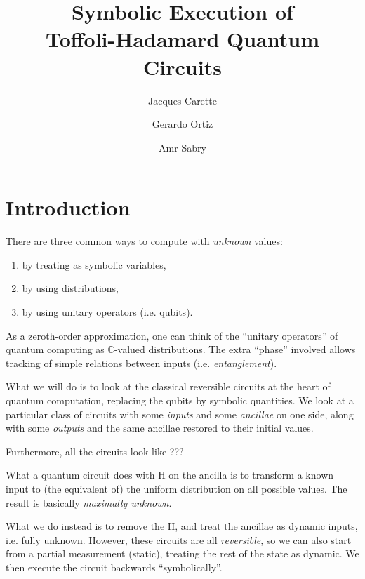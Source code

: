 \documentclass[sigplan]{acmart}
\newcommand{\Cplx}{\ensuremath{\mathbb{C}}}
\begin{document}
\title{Symbolic Execution of \\
  Toffoli-Hadamard Quantum Circuits}

\author{Jacques Carette}

\author{Gerardo Ortiz}

\author{Amr Sabry}

\maketitle

\section{Introduction}

There are three common ways to compute with \emph{unknown} values:
\begin{enumerate}
  \item by treating as symbolic variables,
  \item by using distributions,
  \item by using unitary operators (i.e. qubits).
\end{enumerate}
As a zeroth-order approximation, one can think of the ``unitary operators'' of quantum
computing as \Cplx-valued distributions. The extra ``phase'' involved allows tracking of
simple relations between inputs (i.e. \emph{entanglement}).

What we will do is to look at the classical reversible circuits at the heart
of quantum computation, replacing the qubits by symbolic quantities. We look at a particular
class of circuits with some \emph{inputs} and some \emph{ancillae} on one side, along
with some \emph{outputs} and the same ancillae restored to their initial values.

Furthermore, all the circuits look like ???

What a quantum circuit does with H on the ancilla is to transform a known input to
(the equivalent of) the uniform distribution on all possible values. The result is
basically \emph{maximally unknown}.

What we do instead is to remove the H, and treat the ancillae as dynamic inputs, i.e.
fully unknown. However, these circuits are all \emph{reversible}, so we can also 
start from a partial measurement (static), treating the rest of the state as dynamic.
We then execute the circuit backwards ``symbolically''.
\end{document}
